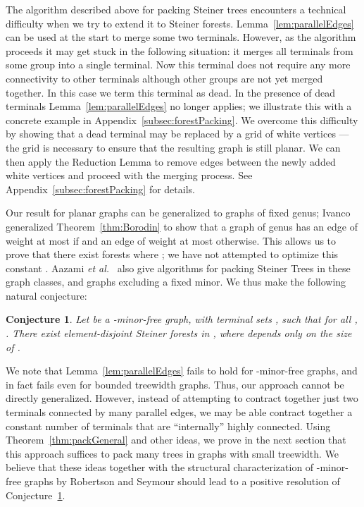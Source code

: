 \documentclass[11pt]{article}
\newtheorem{conjecture}{Conjecture}
\newcommand{\etal}{{\em et al.}\ }
\begin{document}
\smallskip
{} The
algorithm described above for packing Steiner trees encounters a
technical difficulty when we try to extend it to Steiner forests.
Lemma~\ref{lem:parallelEdges} can be used at the start to merge some
two terminals. However, as the algorithm proceeds it may get stuck in
the following situation: it merges all terminals from some group 
into a single terminal. Now this terminal does not require any more
connectivity to other terminals although other groups are not yet
merged together. In this case we term this terminal as dead. In the
presence of dead terminals Lemma~\ref{lem:parallelEdges} no longer
applies; we illustrate this with a concrete example in
Appendix~\ref{subsec:forestPacking}.  We overcome this difficulty by
showing that a dead terminal may be replaced by a grid of white
vertices --- the grid is necessary to ensure that the resulting graph
is still planar.  We can then apply the Reduction Lemma to remove
edges between the newly added white vertices and proceed with the
merging process. See Appendix~\ref{subsec:forestPacking} for details.


\smallskip
{} Our result for planar graphs can be
generalized to graphs of fixed genus; Ivanco \cite{Ivanco} generalized
Theorem~\ref{thm:Borodin} to show that a graph  of genus  has an
edge of weight at most  if  and an edge of
weight at most  otherwise.  This allows us to prove that there
exist  forests where ; we have not attempted
to optimize this constant .  Aazami \etal \cite{ACJ08} also give
algorithms for packing Steiner Trees in these graph classes, and
graphs excluding a fixed minor. We thus make the following natural
conjecture:

\begin{conjecture}
  \label{conj:minorfree}
  Let  be a -minor-free graph, with terminal sets , such that for all , .
  There exist  element-disjoint Steiner forests in ,
  where  depends only on the size of .
\end{conjecture}

We note that Lemma~\ref{lem:parallelEdges} fails to hold for
-minor-free graphs, and in fact fails even for bounded treewidth
graphs. Thus, our approach cannot be directly generalized. However,
instead of attempting to contract together just two terminals
connected by many parallel edges, we may be able contract together a
constant number of terminals that are ``internally'' highly
connected. Using Theorem~\ref{thm:packGeneral} and other ideas, we
prove in the next section that this approach suffices to pack many
trees in graphs with small treewidth. We believe that these ideas
together with the structural characterization of -minor-free graphs
by Robertson and Seymour \cite{RobertsonSeymour} should lead to a
positive resolution of Conjecture~\ref{conj:minorfree}.
\end{document}
